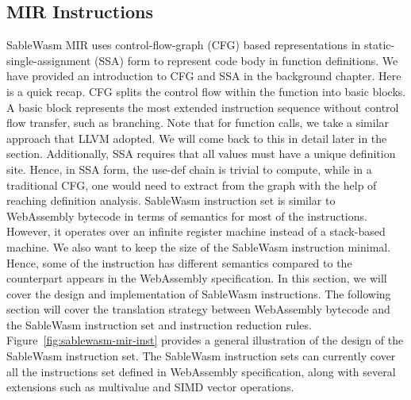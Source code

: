\subsection{MIR Instructions}

SableWasm MIR uses control-flow-graph (CFG) based representations in static-single-assignment (SSA) form to represent code body in function definitions. We have provided an introduction to CFG and SSA in the background chapter. Here is a quick recap. CFG splits the control flow within the function into basic blocks. A basic block represents the most extended instruction sequence without control flow transfer, such as branching. Note that for function calls, we take a similar approach that LLVM adopted. We will come back to this in detail later in the section. Additionally, SSA requires that all values must have a unique definition site. Hence, in SSA form, the use-def chain is trivial to compute, while in a traditional CFG, one would need to extract from the graph with the help of reaching definition analysis. SableWasm instruction set is similar to WebAssembly bytecode in terms of semantics for most of the instructions. However, it operates over an infinite register machine instead of a stack-based machine. We also want to keep the size of the SableWasm instruction minimal. Hence, some of the instruction has different semantics compared to the counterpart appears in the WebAssembly specification. In this section, we will cover the design and implementation of SableWasm instructions. The following section will cover the translation strategy between WebAssembly bytecode and the SableWasm instruction set and instruction reduction rules.  Figure~\ref{fig:sablewasm-mir-inst} provides a general illustration of the design of the SableWasm instruction set. The SableWasm instruction sets can currently cover all the instructions set defined in WebAssembly specification, along with several extensions such as multivalue and SIMD vector operations.

